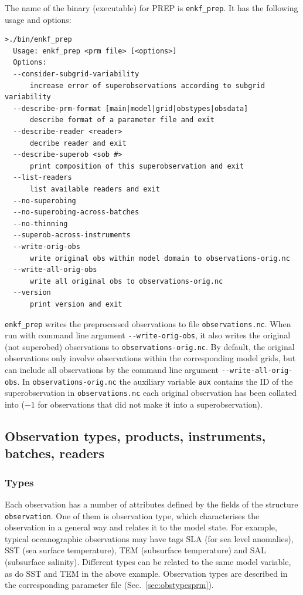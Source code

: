 \documentclass[11pt]{report}
\begin{document}
The name of the binary (executable) for PREP is \verb|enkf_prep|.
It has the following usage and options:
\begin{Verbatim}[frame=single,fontsize=\footnotesize]
>./bin/enkf_prep
  Usage: enkf_prep <prm file> [<options>]
  Options:
  --consider-subgrid-variability
      increase error of superobservations according to subgrid variability
  --describe-prm-format [main|model|grid|obstypes|obsdata]
      describe format of a parameter file and exit
  --describe-reader <reader>
      decribe reader and exit
  --describe-superob <sob #>
      print composition of this superobservation and exit
  --list-readers
      list available readers and exit
  --no-superobing
  --no-superobing-across-batches
  --no-thinning
  --superob-across-instruments
  --write-orig-obs
      write original obs within model domain to observations-orig.nc
  --write-all-orig-obs
      write all original obs to observations-orig.nc
  --version
      print version and exit
\end{Verbatim}

\verb|enkf_prep| writes the preprocessed observations to file \verb|observations.nc|.
When run with command line argument \verb|--write-orig-obs|, it also writes the original (not superobed) observations to \verb|observations-orig.nc|.
By default, the original observations only involve observations within the corresponding model grids, but can include all observations by the command line argument \verb|--write-all-orig-obs|.
In \verb|observations-orig.nc| the auxiliary variable \verb|aux| contains the ID of the superobservation in \verb|observations.nc| each original observation has been collated into ($-1$ for observations that did not make it into a superobservation).

\subsection{Observation types, products, instruments, batches, readers}

\subsubsection{Types}
\label{sec:types}

Each observation has a number of attributes defined by the fields of the structure \verb|observation|.
One of them is observation type, which characterises the observation in a general way and relates it to the model state.
For example, typical oceanographic observations may have tags SLA (for sea level anomalies), SST (sea surface temperature), TEM (subsurface temperature) and SAL (subsurface salinity).
Different types can be related to the same model variable, as do SST and TEM in the above example.
Observation types are described in the corresponding parameter file (Sec.~\ref{sec:obstypesprm}).
\end{document}
